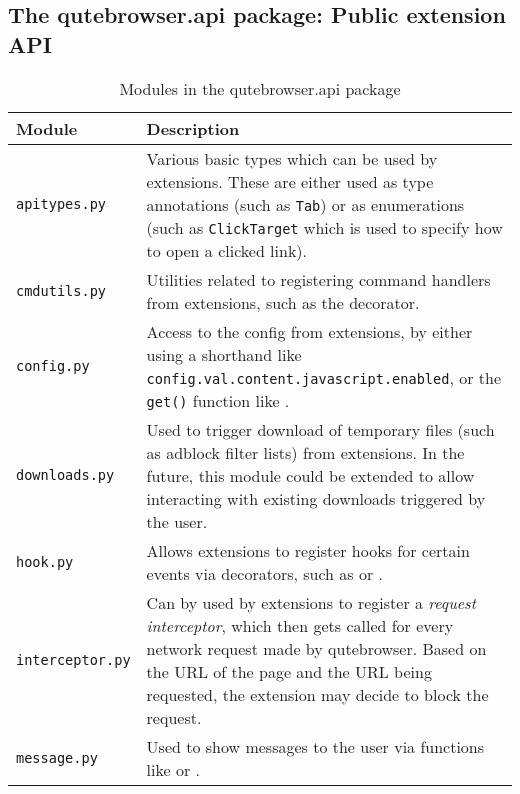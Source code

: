 \subsection[The qutebrowser.api package]{The qutebrowser.api package: Public extension API}

\begin{table}[H]
  \centering
  \begin{tabulary}{\linewidth}{lL}
    \toprule
    Module & Description \\
    \midrule
    \verb|apitypes.py| & Various basic types which can be used by extensions.
                         These are either used as type annotations (such as
                         \verb|Tab|) or as enumerations (such as
                         \verb|ClickTarget| which is used to specify how to open
                         a clicked link). \\
    \verb|cmdutils.py| & Utilities related to registering command handlers from
                         extensions, such as the 
                         decorator. \\
    \verb|config.py| & Access to the config from extensions, by either using a
                       shorthand like
                       \verb|config.val.content.javascript.enabled|, or the
                       \verb|get()| function like
                       . \\
    \verb|downloads.py| & Used to trigger download of temporary files (such as
                          adblock filter lists) from extensions. In the future,
                          this module could be extended to allow interacting
                          with existing downloads triggered by the user. \\
    \verb|hook.py| & Allows extensions to register hooks for certain events via
                     decorators, such as  or
                     . \\
    \verb|interceptor.py| & Can by used by extensions to register a
                            \emph{request interceptor}, which then gets called
                            for every network request made by qutebrowser. Based
                            on the URL of the page and the URL being requested,
                            the extension may decide to block the request. \\
    \verb|message.py| & Used to show messages to the user via functions like
                         or . \\
    \bottomrule
  \end{tabulary}
  \caption{Modules in the qutebrowser.api package}
  \label{tab:apimodule}
\end{table}


